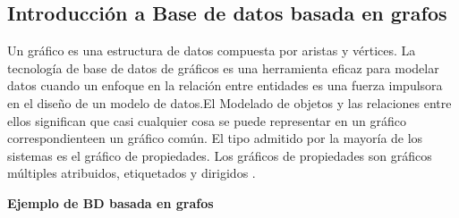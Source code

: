 \subsection{Introducción a Base de datos basada en grafos}
Un gráfico es una estructura de datos compuesta por aristas y vértices. La tecnología de base de datos de gráficos es una herramienta eficaz para modelar
datos cuando un enfoque en la relación entre entidades es una fuerza impulsora en el diseño de un modelo de datos.El Modelado de objetos y las relaciones entre ellos significan que casi cualquier cosa se puede representar en un gráfico correspondienteen un gráfico común.
El tipo admitido por la mayoría de los sistemas es el gráfico de propiedades. Los gráficos de propiedades son gráficos múltiples atribuidos, etiquetados y dirigidos \cite{miller2013graph}.

\vfill
\textbf{Ejemplo de BD basada en grafos}
\vfill

